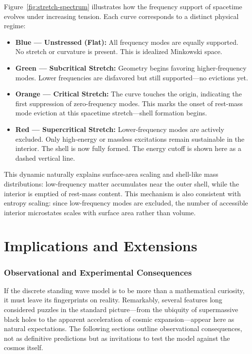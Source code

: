 \documentclass[12pt]{article}
\begin{document}
\newpage
Figure~\ref{fig:stretch-spectrum} illustrates how the frequency support of spacetime evolves under increasing tension. Each curve corresponds to a distinct physical regime:
\begin{itemize}
\item \textbf{Blue --- Unstressed (Flat):} All frequency modes are equally supported. No stretch or curvature is present. This is idealized Minkowski space.

\item \textbf{Green --- Subcritical Stretch:} Geometry begins favoring higher-frequency modes. Lower frequencies are disfavored but still supported---no evictions yet.

\item \textbf{Orange --- Critical Stretch:} The curve touches the origin, indicating the first suppression of zero-frequency modes. This marks the onset of rest-mass mode eviction at this spacetime stretch---shell formation begins.

\item \textbf{Red --- Supercritical Stretch:} Lower-frequency modes are actively excluded. Only high-energy or massless excitations remain sustainable in the interior. The shell is now fully formed.  The energy cutoff is shown here as a dashed vertical line.
\end{itemize}

This dynamic naturally explains surface-area scaling and shell-like mass distributions: low-frequency matter accumulates near the outer shell, while the interior is emptied of rest-mass content.  This mechanism is also consistent with entropy scaling: since low-frequency modes are excluded, the number of accessible interior microstates scales with surface area rather than volume.


\cleardoublepage
\part{Implications and Extensions}

\section{Observational and Experimental Consequences}

If the discrete standing wave model is to be more than a mathematical curiosity, it must leave its fingerprints on reality. Remarkably, several features long considered puzzles in the standard picture---from the ubiquity of supermassive black holes to the apparent acceleration of cosmic expansion---appear here as natural expectations. The following sections outline observational consequences, not as definitive predictions but as invitations to test the model against the cosmos itself.
\end{document}
